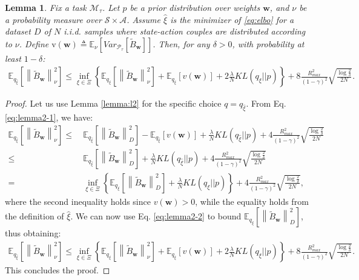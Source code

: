 \documentclass{article}
\newtheorem{lemma}{Lemma}
\newcommand{\wt}[1]{\widetilde{#1}}
\newcommand{\wh}[1]{\widehat{#1}}
\newcommand{\norm}[1]{\left\lVert #1 \right\rVert}
\begin{document}
\begin{lemma}\label{lemma:general-bound}
Fix a task $\mathcal{M}_{\tau}$. Let $p$ be a prior distribution over weights $\bm{w}$, and $\nu$ be a probability measure over $\mathcal{S}\times\mathcal{A}$. Assume $\wh{\xi}$ is the minimizer of \eqref{eq:elbo} for a dataset $D$ of $N$ i.i.d. samples where state-action couples are distributed according to $\nu$. Define $\text{v}(\bm{w}) \triangleq \mathbb{E}_{\nu}\left[Var_{\mathcal{P}_{\tau}}\left[\wt B_{\bm{w}}\right]\right]$. Then, for any $\delta > 0$, with probability at least $1-\delta$:
\begin{align*}
\mathbb{E}_{q_{\wh{\xi}}}\left[ \norm{\wt B_{\bm{w}}}_{\nu}^2 \right ] \leq \inf_{\xi \in \Xi}\left\{ \mathbb{E}_{q_{\xi}}\left[ \norm{\wt B_{\bm{w}}}_{\nu}^2 \right ] + \mathbb{E}_{q_{\xi}}\left[ v(\bm{w}) \right] + 2\frac{\lambda}{N} KL({q_{\xi}}||p) \right\} + 8\frac{R_{max}^2}{(1-\gamma)^2}\sqrt{\frac{\log\frac{2}{\delta}}{2N}}.
\end{align*}
\end{lemma}
\begin{proof}
Let us use Lemma \ref{lemma:l2} for the specific choice $q=q_{\wh{\xi}}$. From Eq. \eqref{eq:lemma2-1}, we have:
\begin{align*}
\mathbb{E}_{q_{\wh{\xi}}}\left[ \norm{\wt B_{\bm{w}}}_{\nu}^2 \right ] \leq\ & \mathbb{E}_{q_{\wh{\xi}}}\left[ \norm{\wt B_{\bm{w}}}_D^2 \right] - \mathbb{E}_{q_{\wh{\xi}}}\left[ v(\bm{w}) \right] + \frac{\lambda}{N} KL({q_{\wh{\xi}}}||p) + 4\frac{R_{max}^2}{(1-\gamma)^2}\sqrt{\frac{\log\frac{2}{\delta}}{2N}}\\ \leq\ & \mathbb{E}_{q_{\wh{\xi}}}\left[ \norm{\wt B_{\bm{w}}}_D^2 \right] + \frac{\lambda}{N} KL({q_{\wh{\xi}}}||p) + 4\frac{R_{max}^2}{(1-\gamma)^2}\sqrt{\frac{\log\frac{2}{\delta}}{2N}}\\ =\ & \inf_{\xi \in \Xi}\left\{ \mathbb{E}_{q_{\xi}}\left[ \norm{\wt B_{\bm{w}}}_D^2 \right] + \frac{\lambda}{N} KL({q_{\xi}}||p) \right\} + 4\frac{R_{max}^2}{(1-\gamma)^2}\sqrt{\frac{\log\frac{2}{\delta}}{2N}},
\end{align*}
where the second inequality holds since $v(\bm{w}) > 0$, while the equality holds from the definition of $\wh{\xi}$. We can now use Eq. \eqref{eq:lemma2-2} to bound $\mathbb{E}_{q_{\xi}}\left[ \norm{\wt B_{\bm{w}}}_D^2 \right]$, thus obtaining:
\begin{align*}
\mathbb{E}_{q_{\wh{\xi}}}\left[ \norm{\wt B_{\bm{w}}}_{\nu}^2 \right ] \leq \inf_{\xi \in \Xi}\left\{ \mathbb{E}_{q_{\xi}}\left[ \norm{\wt B_{\bm{w}}}_{\nu}^2 \right ] + \mathbb{E}_{q_{\xi}}\left[ v(\bm{w}) \right] + 2\frac{\lambda}{N} KL({q_{\xi}}||p) \right\} + 8\frac{R_{max}^2}{(1-\gamma)^2}\sqrt{\frac{\log\frac{2}{\delta}}{2N}}.
\end{align*}
This concludes the proof.
\end{proof}
\end{document}
